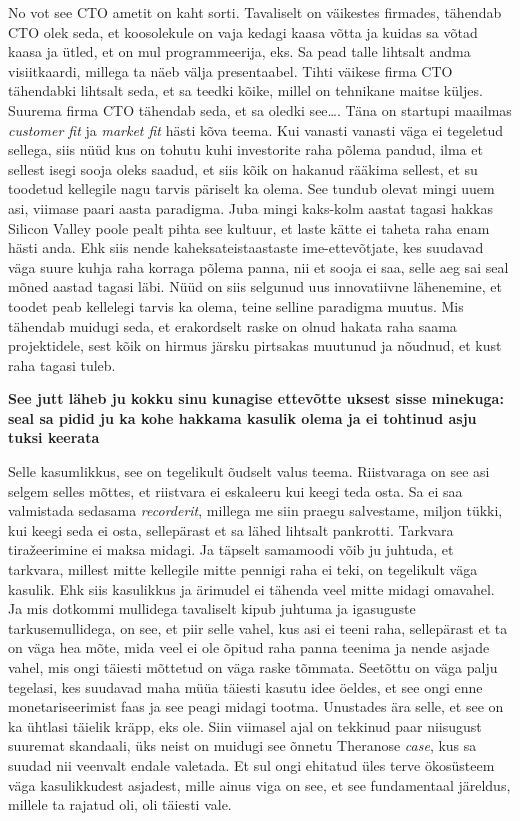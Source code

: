 No vot see CTO ametit on kaht sorti. Tavaliselt on väikestes firmades, tähendab CTO olek seda, et koosolekule on vaja kedagi kaasa võtta ja kuidas sa võtad kaasa ja ütled, et on mul programmeerija, eks. Sa pead talle lihtsalt andma visiitkaardi, millega ta näeb välja presentaabel. Tihti väikese firma CTO tähendabki lihtsalt seda, et sa teedki kõike, millel on tehnikane maitse küljes. Suurema firma CTO tähendab seda, et sa oledki see\ldots. Täna on startupi maailmas \emph{customer fit} ja \emph{market fit} hästi kõva teema. Kui vanasti vanasti väga ei tegeletud sellega, siis nüüd kus on tohutu kuhi investorite raha põlema pandud, ilma et sellest isegi sooja oleks saadud, et siis kõik on hakanud rääkima sellest, et su toodetud kellegile nagu tarvis päriselt ka olema. See tundub olevat mingi uuem asi, viimase paari aasta paradigma. Juba mingi kaks-kolm aastat tagasi hakkas Silicon Valley poole pealt pihta see kultuur, et laste kätte ei taheta raha enam hästi anda. Ehk siis nende kaheksateistaastaste ime-ettevõtjate, kes suudavad  väga suure kuhja raha korraga põlema panna, nii et sooja ei saa,  selle aeg sai seal mõned aastad tagasi läbi. Nüüd on siis  selgunud uus innovatiivne lähenemine, et toodet peab kellelegi tarvis ka olema, teine selline paradigma muutus. Mis tähendab muidugi seda, et erakordselt raske on olnud hakata raha saama projektidele, sest kõik on hirmus järsku pirtsakas muutunud ja nõudnud, et kust raha tagasi tuleb. 

\textbf{See jutt läheb ju kokku sinu kunagise ettevõtte uksest sisse minekuga: seal sa pidid ju ka kohe hakkama kasulik olema ja ei tohtinud asju tuksi keerata}

Selle kasumlikkus, see on tegelikult õudselt valus teema. Riistvaraga on see asi  selgem selles mõttes, et riistvara ei eskaleeru kui keegi teda osta. Sa ei saa valmistada sedasama \emph{recorderit}, millega me siin praegu salvestame, miljon tükki, kui keegi seda ei osta, sellepärast et sa lähed lihtsalt pankrotti. Tarkvara tiražeerimine ei maksa midagi. Ja täpselt samamoodi võib ju juhtuda, et tarkvara, millest mitte kellegile mitte pennigi raha ei teki, on tegelikult väga kasulik. Ehk siis kasulikkus ja ärimudel ei tähenda veel mitte midagi omavahel. Ja mis  dotkommi mullidega tavaliselt kipub juhtuma ja igasuguste tarkusemullidega, on see, et piir selle vahel, kus asi ei teeni raha, sellepärast et ta on väga hea mõte, mida veel ei ole õpitud raha panna teenima ja nende asjade vahel, mis ongi täiesti mõttetud on väga raske tõmmata. Seetõttu on väga palju tegelasi, kes suudavad maha müüa  täiesti kasutu idee öeldes, et see ongi enne monetariseerimist faas ja see peagi midagi tootma. Unustades ära selle, et see on ka ühtlasi täielik kräpp, eks ole. Siin  viimasel ajal on tekkinud paar niisugust suuremat skandaali, üks neist on muidugi see õnnetu Theranose \emph{case}, kus sa suudad nii veenvalt endale valetada. Et sul ongi ehitatud üles terve ökosüsteem väga kasulikkudest asjadest, mille ainus viga on see, et see fundamentaal järeldus, millele ta rajatud oli, oli täiesti vale. 

